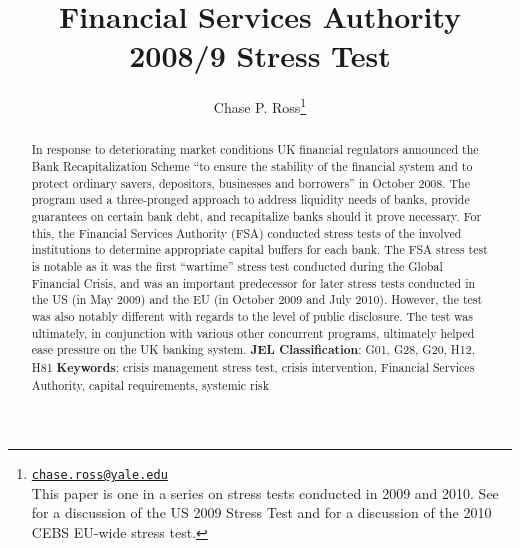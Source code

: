 \documentclass[12pt]{article}
\begin{document}
\lhead{}
\rhead{}

\renewcommand{\headrulewidth}{0.0pt}
\renewcommand{\footrulewidth}{0.0pt}


\title{Financial Services Authority 2008/9 Stress Test}%
\author{Chase P. Ross\thanks{\texttt{\href{mailto:chase.ross@yale.edu}{chase.ross@yale.edu}} \\ This paper is one in a series on stress tests conducted in 2009 and 2010. See \citet{Ross2016a} for a discussion of the US 2009 Stress Test and \citet{Ross2016b} for a discussion of the 2010 CEBS EU-wide stress test.}}



\maketitle

\begin{abstract}

In response to deteriorating market conditions UK financial regulators announced the Bank Recapitalization Scheme ``to ensure the stability of the financial system and to protect ordinary savers, depositors, businesses and borrowers'' in October 2008.  The program used a three-pronged approach to address liquidity needs of banks, provide guarantees on certain bank debt, and recapitalize banks should it prove necessary. For this, the Financial Services Authority (FSA) conducted stress tests of the involved institutions to determine appropriate capital buffers for each bank. The FSA stress test is notable as it was the first ``wartime'' stress test conducted during the Global Financial Crisis, and was an important predecessor for later stress tests conducted in the US (in May 2009) and the EU (in October 2009 and July 2010). However, the test was also notably different with regards to the level of public disclosure. The test was ultimately, in conjunction with various other concurrent programs, ultimately helped ease pressure on the UK banking system.
\newline
\newline
\textbf{JEL Classification}: G01, G28, G20, H12, H81
\newline
\textbf{Keywords}: crisis management stress test, crisis intervention, Financial Services Authority, capital requirements, systemic risk

\end{abstract}
\newpage
\tableofcontents
\newpage
\end{document}
